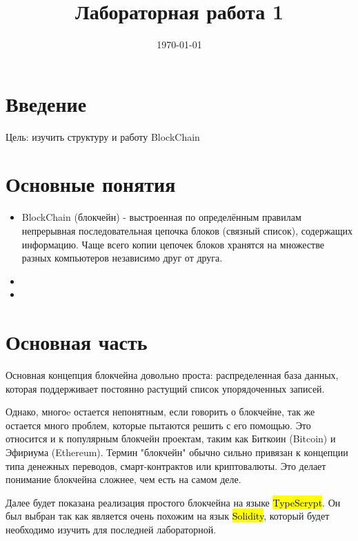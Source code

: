 \documentclass{article}
\begin{document}
\title{Лабораторная работа 1}

\date{\today}
\maketitle


\section{Введение}

Цель: изучить структуру и работу BlockChain


\section{Основные понятия}


\begin{itemize}
	\item BlockChain (блокчейн) - выстроенная по определённым правилам непрерывная последовательная цепочка блоков (связный список), содержащих информацию. Чаще всего копии цепочек блоков хранятся на множестве разных компьютеров независимо друг от друга. 
	\item 
	\item 	
\end{itemize}


\section{Основная часть}

Основная концепция блокчейна довольно проста: распределенная база данных, которая поддерживает постоянно растущий список упорядоченных записей. 

Однако, многоe остается непонятным, если говорить о блокчейне, так же остается много проблем, которые пытаются решить с его помощью. Это относится и к популярным блокчейн проектам, таким как Биткоин (Bitcoin) и Эфириума (Ethereum). Термин "блокчейн" обычно сильно привязан к концепции типа денежных переводов, смарт-контрактов или криптовалюты. Это делает понимание блокчейна сложнее, чем есть на самом деле.

Далее будет показана реализация простого блокчейна на языке  \hl{TypeScrypt}. Он был выбран так как является очень похожим на язык \hl{Solidity}, который будет необходимо изучить для последней лабораторной.
\end{document}
